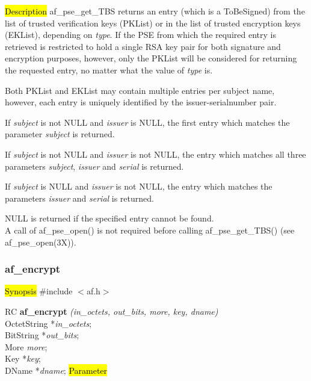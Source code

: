 


\hl{Description}
af\_pse\_get\_TBS returns an entry (which is a ToBeSigned) from the list of trusted 
verification keys (PKList) or in the list of trusted encryption keys (EKList), depending
on {\em type}.
If the PSE from which the required entry is retrieved is restricted to hold a single RSA key pair
for both signature and encryption purposes, however, only the PKList will be considered for returning the requested entry,
no matter what the value of {\em type} is.

Both PKList and EKList may contain multiple entries per subject name, however,
each entry is uniquely identified by the issuer-serialnumber pair.

If {\em subject} is not NULL and {\em issuer} is NULL, the first entry which
matches the parameter {\em subject} is returned.

If {\em subject} is not NULL and {\em issuer} is not NULL, the entry which 
matches all three parameters {\em subject}, {\em issuer} and {\em serial} is returned.
 
If {\em subject} is NULL and {\em issuer} is not NULL, the entry which matches the
parameters {\em issuer} and {\em serial} is returned.

NULL is returned if the specified entry cannot be found.
\\ [1em]
A call of af\_pse\_open() is not required before calling af\_pse\_get\_TBS()
(see af\_pse\_open(3X)).

\subsubsection{af\_encrypt}
\label{af_encrypt}
\hl{Synopsis}
\#include $<$af.h$>$

RC {\bf af\_encrypt} {\em (in\_octets, out\_bits, more, key, dname)} \\
OctetString *{\em in\_octets}; \\
BitString *{\em out\_bits}; \\
More {\em more}; \\
Key *{\em key}; \\
DName *{\em dname};
\hl{Parameter}

